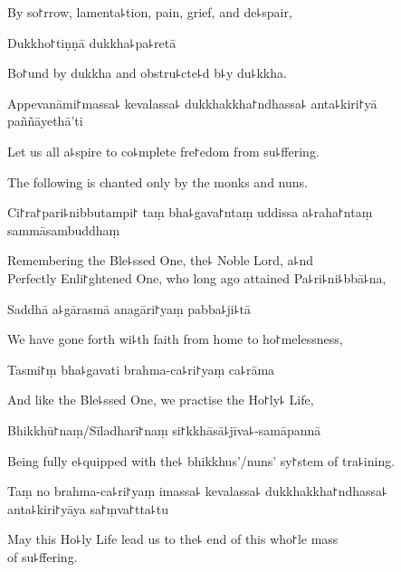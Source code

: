 \begin{english}
  By so꜓rrow, lamenta꜕tion, pain, grief, and de꜕spair,
\end{english}

Dukkho꜓tiṇṇā dukkha꜕pa꜕retā

\begin{english}
  Bo꜓und by dukkha and obstru꜕cte꜕d b꜕y du꜕kkha.
\end{english}

Appevanāmi꜓massa꜕ kevalassa꜕ dukkhakkha꜓ndhassa꜕ anta꜕kiri꜓yā \\paññāyethā'ti

\begin{english}
  Let us all a꜕spire to co꜕mplete fre꜓edom from su꜕ffering.
\end{english}

\begin{instruction}
  The following is chanted only by the monks and nuns.
\end{instruction}

Ci꜓ra꜓pari꜕nibbutampi꜓ taṃ bha꜕gava꜓ntaṃ uddissa a꜕raha꜓ntaṃ sammāsambuddhaṃ

\begin{english}
  Remembering the Ble꜕ssed One, the꜕ Noble Lord, a꜕nd \\Perfectly Enli꜓ghtened One, who long ago attained Pa꜕ri꜕ni꜕bbā꜕na,
\end{english}

Saddhā a꜕gārasmā anagāri꜓yaṃ pabba꜕ji꜕tā

\begin{english}
  We have gone forth wi꜕th faith from home to ho꜓melessness,
\end{english}

Tasmi꜓ṃ bha꜕gavati brahma-ca꜕ri꜓yaṃ ca꜕rāma

\begin{english}
  And like the Ble꜕ssed One, we practise the Ho꜓ly꜕ Life,
\end{english}

Bhikkhū꜓naṃ/Sīladharī꜓naṃ si꜓kkhāsā꜕jīva꜕-samāpannā

\begin{english}
  Being fully e꜕quipped with the꜕ bhikkhus'/nuns' sy꜓stem of tra꜕ining.
\end{english}

Taṃ no brahma-ca꜕ri꜓yaṃ imassa꜕ kevalassa꜕ dukkhakkha꜓ndhassa꜕ anta꜕kiri꜓yāya sa꜓ṃva꜓tta꜕tu

\begin{english}
  May this Ho꜕ly Life lead us to the꜕ end of this who꜓le mass \\of su꜕ffering.
\end{english}

